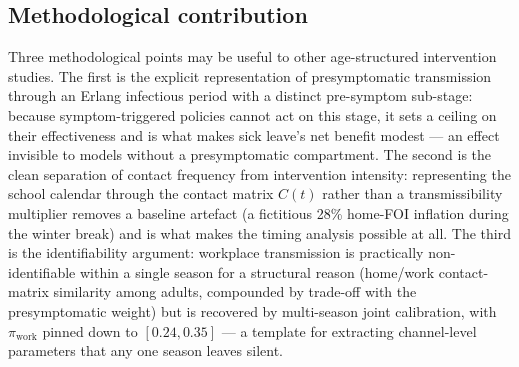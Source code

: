 \documentclass[12pt]{article}
\theoremstyle{plain}
\theoremstyle{remark}
\theoremstyle{definition}
\begin{document}
\subsection{Methodological contribution}
Three methodological points may be useful to other age-structured intervention studies. The first is the explicit representation of presymptomatic transmission through an Erlang infectious period with a distinct pre-symptom sub-stage: because symptom-triggered policies cannot act on this stage, it sets a ceiling on their effectiveness and is what makes sick leave's net benefit modest --- an effect invisible to models without a presymptomatic compartment. The second is the clean separation of contact frequency from intervention intensity: representing the school calendar through the contact matrix $C(t)$ rather than a transmissibility multiplier removes a baseline artefact (a fictitious 28\% home-FOI inflation during the winter break) and is what makes the timing analysis possible at all. The third is the identifiability argument: workplace transmission is practically non-identifiable within a single season for a structural reason (home/work contact-matrix similarity among adults, compounded by trade-off with the presymptomatic weight) but is recovered by multi-season joint calibration, with $\pi_{\mathrm{work}}$ pinned down to $[0.24, 0.35]$ --- a template for extracting channel-level parameters that any one season leaves silent.
\end{document}
